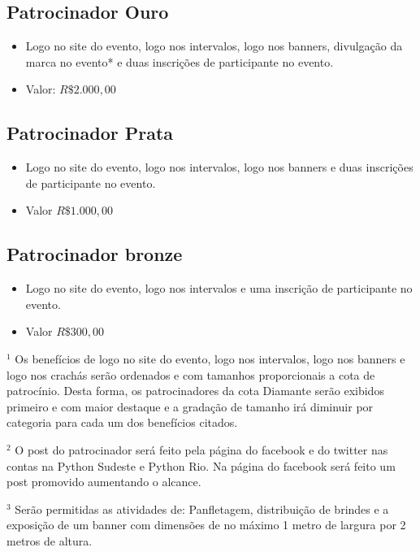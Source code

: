 \documentclass[12pt]{article}
\begin{document}
\subsection{Patrocinador Ouro}
  \begin{itemize}[label={}]
        \item Logo no site do evento, logo nos intervalos, logo nos banners, divulgação da marca no evento* e duas inscrições de participante no evento.
        \item Valor: $R\$ 2.000,00$
  \end{itemize}
\subsection{Patrocinador Prata}
    \begin{itemize}[label={}]
        \item Logo no site do evento, logo nos intervalos, logo nos banners e duas inscrições de participante no evento.
        \item Valor $R\$ 1.000,00$
    \end{itemize}
\subsection{Patrocinador bronze}
    \begin{itemize}[label={}]
        \item Logo no site do evento, logo nos intervalos e uma inscrição de participante no evento.
        \item Valor $R\$ 300,00$
    \end{itemize}

$^1$ Os benefícios de logo no site do evento, logo nos intervalos, logo nos banners e logo nos crachás serão ordenados e com tamanhos proporcionais a cota de patrocínio. Desta forma, os patrocinadores da cota Diamante serão exibidos primeiro e com maior destaque e a gradação de tamanho irá diminuir por categoria para cada um dos benefícios citados.

$^2$ O post do patrocinador será feito pela página do facebook e do twitter nas contas na Python Sudeste e Python Rio. Na página do facebook será feito um post promovido aumentando o alcance.

$^3$ Serão permitidas as atividades de: Panfletagem, distribuição de brindes e a exposição de um  banner com dimensões de no máximo 1 metro de largura por 2 metros de  altura.
\end{document}
